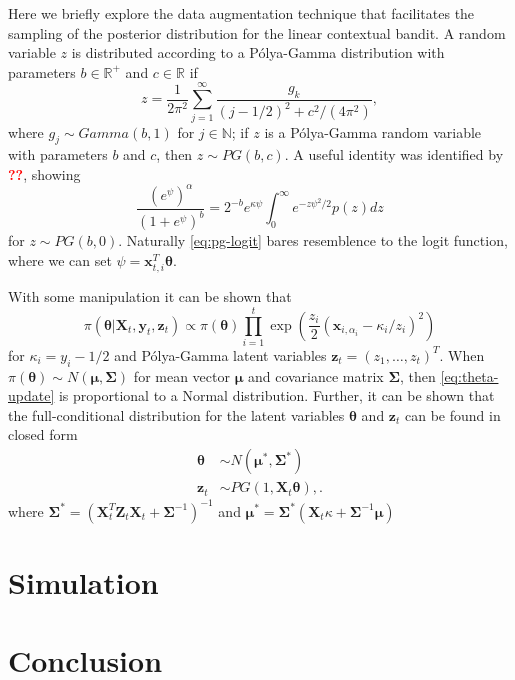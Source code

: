 \documentclass[12pt]{article}
\newcommand{\bred}[1]{\textbf{\textcolor{red}{#1}}}
\begin{document}
Here we briefly explore the data augmentation technique that facilitates the 
sampling of the posterior distribution for the linear contextual bandit.
A random variable $z$ is distributed according to a P\'olya-Gamma distribution
with parameters $b \in \mathbb{R}^{+}$ and $c \in \mathbb{R}$ if 
\begin{equation}
z = \frac{1}{2\pi^2} \sum_{j = 1}^\infty \frac{g_k}{(j - 1/2)^2 + c^2/(4\pi^2)},
\end{equation}
where 
$g_j \sim Gamma(b,1)$ 
for $j \in \mathbb{N}$; if $z$ is a P\'olya-Gamma random variable with parameters
$b$ and $c$, then $z \sim PG(b,c)$. 
A useful identity was identified by \bred{??}, showing
\begin{equation}
\frac{(e^\psi)^\alpha}{(1 + e^\psi)^b}
= 2^{-b}e^{\kappa\psi}
\int_0^\infty e^{-z\psi^2 / 2} p(z) dz
\label{eq:pg-logit}
\end{equation}
for $z \sim PG(b,0)$.
Naturally \eqref{eq:pg-logit} bares resemblence to the logit function, where we
can set $\psi = \bm{x}_{t,i}^T\bm{\theta}$.

With some manipulation it can be shown that
\begin{equation}
\pi(\bm{\theta} \vert \bm{X}_t, \bm{y}_t, \bm{z}_t)
\propto \pi(\bm{\theta})
\prod_{i = 1}^t \exp(\frac{z_i}{2} (\bm{x}_{i,\alpha_i} - \kappa_i/z_i)^2)
\label{eq:theta-update}
\end{equation}
for $\kappa_i = y_i - 1/2$ and P\'olya-Gamma latent variables 
$\bm{z}_t = (z_1, \ldots, z_t)^T$. 
When $\pi(\bm{\theta}) \sim N(\bm{\mu}, \bm{\Sigma})$ 
for mean vector $\bm{\mu}$ and covariance matrix $\bm{\Sigma}$, then
\eqref{eq:theta-update} is proportional to a Normal distribution.
Further, it can be shown that the full-conditional distribution for the latent
variables $\bm{\theta}$ and $\bm{z}_t$ can be found in closed form
\begin{align}
\bm{\theta} & \sim N(\bm{\mu}^*, \bm{\Sigma}^*) \label{eq:coef-fullcond}\\
\bm{z}_t & \sim PG(1, \bm{X}_t \bm{\theta}), \label{eq:aug-fullcond}.
\end{align}
where 
$\bm{\Sigma}^* = (\bm{X}_t^T \bm{Z}_t \bm{X}_t + \bm{\Sigma}^{-1})^{-1}$
and 
$\bm{\mu}^* = \bm{\Sigma}^*(\bm{X}_t \kappa + \bm{\Sigma}^{-1}\bm{\mu})$

\section{Simulation}


\section{Conclusion}
\end{document}
